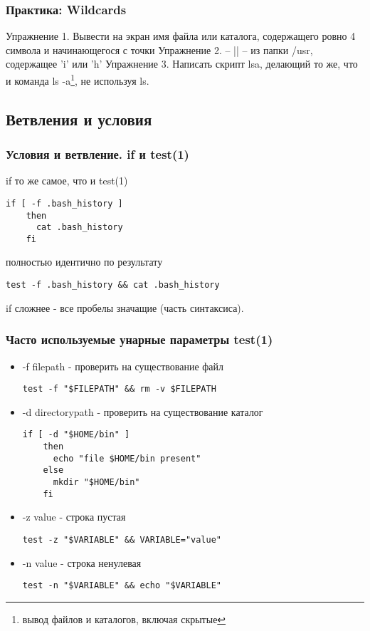 \begin{frame}
  \frametitle{Практика: Wildcards}

  \alert{Упражнение 1.} Вывести на экран имя файла или каталога, содержащего ровно 4 символа и начинающегося с точки
  \pause
  \alert{Упражнение 2.} -- || --  из папки /usr, содержащее 'i' или 'h'
  \pause
  \alert{Упражнение 3.} Написать скрипт lsa, делающий то же, что и команда \textqutedbl ls -a\textqutedbl \footnote{вывод файлов и каталогов, включая скрытые}, не используя \textqutedbl ls\textqutedbl .
\end{frame}

\subsection{Ветвления и условия}

\begin{frame}[fragile]
  \frametitle{Условия и ветвление. if и test(1)}

  \alert{if то же самое, что и test(1)} \pause

\begin{lstlisting}[basicstyle=\normalsize]
	if [ -f .bash_history ]
	then
	  cat .bash_history
	fi
\end{lstlisting} 
      полностью идентично по результату
\begin{lstlisting}[basicstyle=\normalsize]
	test -f .bash_history && cat .bash_history
\end{lstlisting}
      if сложнее - все пробелы значащие (часть синтаксиса).
\end{frame}

\begin{frame}[fragile]
  \frametitle{Часто используемые унарные параметры test(1)}
  \begin{itemize}
    \item \alert{-f filepath} - проверить на существование файл
\begin{lstlisting}[basicstyle=\normalsize]
	test -f "$FILEPATH" && rm -v $FILEPATH
\end{lstlisting} \pause
    \item \alert{-d directorypath} - проверить на существование каталог
\begin{lstlisting}[basicstyle=\tiny]
	if [ -d "$HOME/bin" ]
	then 
	  echo "file $HOME/bin present"
	else
	  mkdir "$HOME/bin"
	fi
\end{lstlisting} \pause
    \item \alert{-z \textqutedbl value\textqutedbl } - строка пустая
\begin{lstlisting}[basicstyle=\normalsize]
	test -z "$VARIABLE" && VARIABLE="value"
\end{lstlisting} \pause
    \item \alert{-n \textqutedbl value\textqutedbl } - строка ненулевая
\begin{lstlisting}[basicstyle=\normalsize]
	test -n "$VARIABLE" && echo "$VARIABLE"
\end{lstlisting} 
  \end{itemize}

\end{frame}

